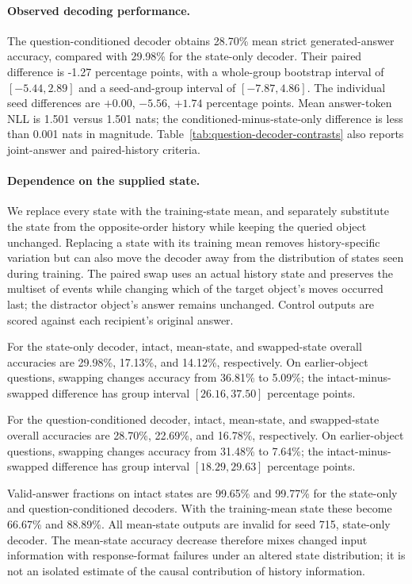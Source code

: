 

\paragraph{Observed decoding performance.}

The question-conditioned decoder obtains 28.70\% mean strict generated-answer accuracy, compared with 29.98\% for the state-only decoder. Their paired difference is -1.27 percentage points, with a whole-group bootstrap interval of $[-5.44, 2.89]$ and a seed-and-group interval of $[-7.87, 4.86]$. The individual seed differences are $+0.00$, $-5.56$, $+1.74$ percentage points. Mean answer-token NLL is 1.501 versus 1.501 nats; the conditioned-minus-state-only difference is less than 0.001 nats in magnitude. Table~\ref{tab:question-decoder-contrasts} also reports joint-answer and paired-history criteria.

\paragraph{Dependence on the supplied state.}

We replace every state with the training-state mean, and separately substitute the state from the opposite-order history while keeping the queried object unchanged. Replacing a state with its training mean removes history-specific variation but can also move the decoder away from the distribution of states seen during training. The paired swap uses an actual history state and preserves the multiset of events while changing which of the target object's moves occurred last; the distractor object's answer remains unchanged. Control outputs are scored against each recipient's original answer.

For the state-only decoder, intact, mean-state, and swapped-state overall accuracies are 29.98\%, 17.13\%, and 14.12\%, respectively. On earlier-object questions, swapping changes accuracy from 36.81\% to 5.09\%; the intact-minus-swapped difference has group interval $[26.16, 37.50]$ percentage points.

For the question-conditioned decoder, intact, mean-state, and swapped-state overall accuracies are 28.70\%, 22.69\%, and 16.78\%, respectively. On earlier-object questions, swapping changes accuracy from 31.48\% to 7.64\%; the intact-minus-swapped difference has group interval $[18.29, 29.63]$ percentage points.

Valid-answer fractions on intact states are 99.65\% and 99.77\% for the state-only and question-conditioned decoders. With the training-mean state these become 66.67\% and 88.89\%. All mean-state outputs are invalid for seed 715, state-only decoder. The mean-state accuracy decrease therefore mixes changed input information with response-format failures under an altered state distribution; it is not an isolated estimate of the causal contribution of history information.

